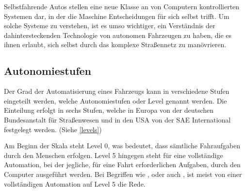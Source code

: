 Selbstfahrende Autos stellen eine neue Klasse an von Computern kontrollierten Systemen dar, in der die Maschine Entscheidungen für sich selbst trifft. Um solche Systeme zu verstehen, ist es umso wichtiger, ein Verständnis der dahintersteckenden Technologie von autonomen Fahrzeugen zu haben, die es ihnen erlaubt, sich selbst durch das komplexe Straßennetz zu manövrieren.

\subsection{Autonomiestufen}
Der Grad der Automatisierung eines Fahrzeugs kann in verschiedene Stufen eingeteilt werden, welche Autonomiestufen oder Level genannt werden. Die Einteilung erfolgt in sechs Stufen, welche in Europa \ua von der deutschen Bundesanstalt für Straßenwesen und in den USA von der SAE International festgelegt werden. (Siehe \ref{levels})

Am Beginn der Skala steht Level 0, was bedeutet, dass sämtliche Fahraufgaben durch den Menschen erfolgen. Level 5 hingegen steht für eine vollständige Automation, bei der jegliche, für eine Fahrt erforderlichen Aufgaben, durch den Computer ausgeführt werden. Bei Begriffen wie ,  oder auch , ist meist von einer vollständigen Automation auf Level 5 die Rede.

\nocite{wiki-levels}

